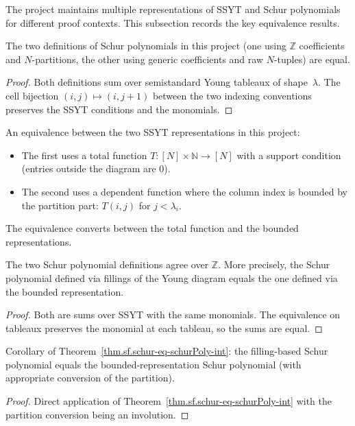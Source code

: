 The project maintains multiple representations of SSYT and Schur polynomials
for different proof contexts. This subsection records the key equivalence results.

\begin{theorem}
\label{thm.sf.schurPoly-eq-AC-schurPoly}
\leanhelper
\leanok
The two definitions of Schur polynomials in this project
(one using $\mathbb{Z}$ coefficients and $N$-partitions,
the other using generic coefficients and raw $N$-tuples)
are equal.
\end{theorem}

\begin{proof}
Both definitions sum over semistandard Young tableaux of shape~$\lambda$.
The cell bijection $(i,j) \mapsto (i,j+1)$ between the two indexing conventions
preserves the SSYT conditions and the monomials.
\end{proof}

\begin{definition}
\label{def.sf.ssyt-equiv}
\leanhelper
\leanok
An equivalence between the two SSYT representations in this project:
\begin{itemize}
\item The first uses a total function $T : [N] \times \mathbb{N} \to [N]$
  with a support condition (entries outside the diagram are $0$).
\item The second uses a dependent function where the column index
  is bounded by the partition part: $T(i, j)$ for $j < \lambda_i$.
\end{itemize}
The equivalence converts between the total function and the bounded
representations.
\end{definition}

\begin{theorem}
\label{thm.sf.schur-eq-schurPoly-int}
\leanhelper
\leanok
The two Schur polynomial definitions agree over $\mathbb{Z}$.
More precisely, the Schur polynomial defined via fillings of the Young diagram
equals the one defined via the bounded representation.
\end{theorem}

\begin{proof}
Both are sums over SSYT with the same monomials.
The equivalence on tableaux preserves the monomial
at each tableau, so the sums are equal.
\end{proof}

\begin{theorem}
\label{thm.sf.schurPoly-eq-schur}
\leanhelper
\leanok
Corollary of Theorem~\ref{thm.sf.schur-eq-schurPoly-int}:
the filling-based Schur polynomial equals the bounded-representation
Schur polynomial (with appropriate conversion of the partition).
\end{theorem}

\begin{proof}
\leanok
Direct application of Theorem~\ref{thm.sf.schur-eq-schurPoly-int} with the
partition conversion being an involution.
\end{proof}
